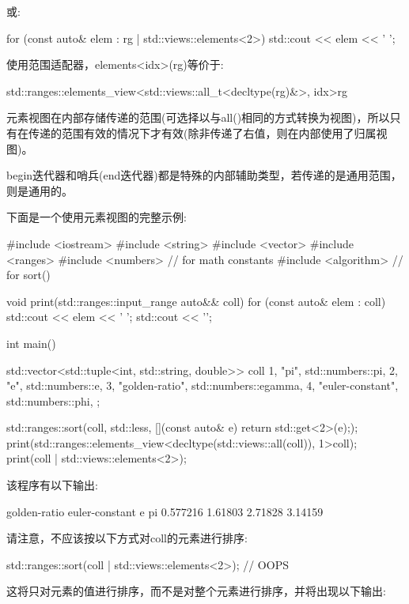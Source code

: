 或:

\begin{cpp}
for (const auto& elem : rg | std::views::elements<2>) {
	std::cout << elem << ' ';
}
\end{cpp}

使用范围适配器，elements<idx>(rg)等价于:

\begin{cpp}
std::ranges::elements_view<std::views::all_t<decltype(rg)&>, idx>{rg}
\end{cpp}

元素视图在内部存储传递的范围(可选择以与all()相同的方式转换为视图)，所以只有在传递的范围有效的情况下才有效(除非传递了右值，则在内部使用了归属视图)。

begin迭代器和哨兵(end迭代器)都是特殊的内部辅助类型，若传递的是通用范围，则是通用的。

下面是一个使用元素视图的完整示例:


\begin{cpp}
#include <iostream>
#include <string>
#include <vector>
#include <ranges>
#include <numbers> // for math constants
#include <algorithm> // for sort()

void print(std::ranges::input_range auto&& coll)
{
	for (const auto& elem : coll) {
		std::cout << elem << ' ';
	}
	std::cout << '\n';
}

int main()
{
	std::vector<std::tuple<int, std::string, double>> coll{
		{1, "pi", std::numbers::pi},
		{2, "e", std::numbers::e},
		{3, "golden-ratio", std::numbers::egamma},
		{4, "euler-constant", std::numbers::phi},
	};
	
	std::ranges::sort(coll, std::less{},
					  [](const auto& e) {return std::get<2>(e);});
	print(std::ranges::elements_view<decltype(std::views::all(coll)), 1>{coll});
	print(coll | std::views::elements<2>);
}
\end{cpp}

该程序有以下输出:

\begin{shell}
golden-ratio euler-constant e pi
0.577216 1.61803 2.71828 3.14159
\end{shell}

请注意，不应该按以下方式对coll的元素进行排序:

\begin{cpp}
std::ranges::sort(coll | std::views::elements<2>); // OOPS
\end{cpp}

这将只对元素的值进行排序，而不是对整个元素进行排序，并将出现以下输出:

